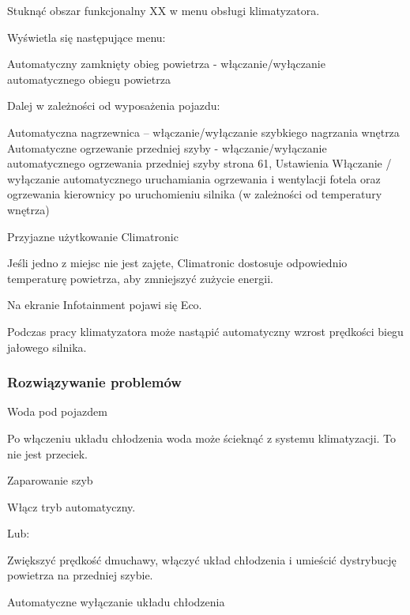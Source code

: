 \begin{itemizeArrow}
	\itemArrow Stuknąć obszar funkcjonalny XX w menu obsługi klimatyzatora.
\end{itemizeArrow}

Wyświetla się następujące menu:
\begin{itemizeTriangle}
	\itemTriangle Automatyczny zamknięty obieg powietrza - włączanie/wyłączanie automatycznego obiegu powietrza
\end{itemizeTriangle}
Dalej w zależności od wyposażenia pojazdu:
\begin{itemizeTriangle}
	\itemTriangle Automatyczna nagrzewnica – włączanie/wyłączanie szybkiego nagrzania wnętrza
	\itemTriangle Automatyczne ogrzewanie przedniej szyby - włączanie/wyłączanie automatycznego ogrzewania przedniej szyby \guillemotright strona 61, Ustawienia
	\itemTriangle Włączanie / wyłączanie automatycznego uruchamiania ogrzewania i wentylacji fotela oraz ogrzewania kierownicy po uruchomieniu silnika (w zależności od temperatury wnętrza)
\end{itemizeTriangle}

Przyjazne użytkowanie Climatronic

Jeśli jedno z miejsc nie jest zajęte, Climatronic dostosuje odpowiednio temperaturę powietrza, aby zmniejszyć zużycie energii.

Na ekranie Infotainment pojawi się Eco.

Podczas pracy klimatyzatora może nastąpić automatyczny wzrost prędkości biegu jałowego silnika.

\subsubsection{Rozwiązywanie problemów}

Woda pod pojazdem

Po włączeniu układu chłodzenia woda może ścieknąć z systemu klimatyzacji. To nie jest przeciek.

Zaparowanie szyb

\begin{itemizeArrow}
	\itemArrow Włącz tryb automatyczny.
\end{itemizeArrow}
Lub:
\begin{itemizeArrow}
	\itemArrow Zwiększyć prędkość dmuchawy, włączyć układ chłodzenia i umieścić dystrybucję powietrza na przedniej szybie.
\end{itemizeArrow}

Automatyczne wyłączanie układu chłodzenia

